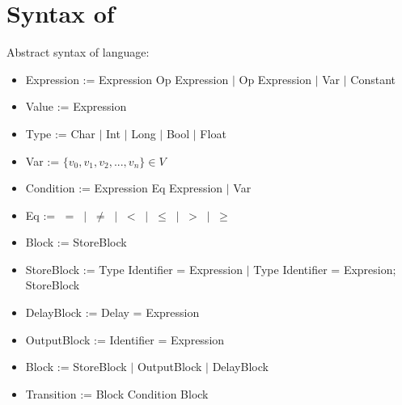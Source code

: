 \section{Syntax of \plcchart}
\label{sec:statechartsyn}

Abstract syntax of \plcchart language:
\begin{definition}
\plcchart

\begin{itemize}
	\item Expression := Expression Op Expression $\mid$ Op Expression $\mid$ Var $\mid$ Constant
	\item Value := Expression
	\item Type := Char $\mid$ Int $\mid$ Long $\mid$ Bool $\mid$ Float
	\item Var := $\{v_0,v_1,v_2,...,v_n\} \in V$

	\item Condition := Expression Eq Expression $\mid$ Var
	
	\item Eq := $\; = \; \mid \; \neq \; \mid \; < \; \mid \; \leq \; \mid \; > \; \mid \; \geq$	

	\item Block := StoreBlock	
		
	\item StoreBlock := Type Identifier = Expression $\mid$ Type Identifier = Expresion; StoreBlock
	\item DelayBlock := Delay = Expression
	\item OutputBlock := Identifier = Expression
	\item Block := StoreBlock $\mid$ OutputBlock $\mid$ DelayBlock
	
	
	\item Transition := Block Condition Block
\end{itemize}
\end{definition}

